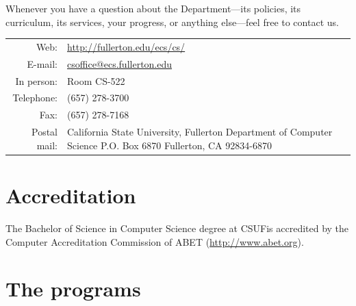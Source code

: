 \documentclass{book}
\newcommand{\campusname}{CSUF}
\begin{document}
Whenever you have a question about the Department---its policies, its curriculum, its services, your progress, or anything else---feel free to contact us.

\begin{tabular}{r p{6in}} %
  Web: & \url{http://fullerton.edu/ecs/cs/} \\ \index{website}
  E-mail: & \href{mailto:csoffice@ecs.fullerton.edu}{csoffice@ecs.fullerton.edu} \\ \index{e-mail}
  In person: & Room CS-522 \\ \index{department office}
  Telephone: & (657) 278-3700 \\ \index{phone number} \index{telephone number}
  Fax: & (657) 278-7168 \\ \index{fax number}
  Postal mail: & California State University, Fullerton \newline\index{postal address}\index{address}Department of Computer Science \newline
P.O. Box 6870 \newline
Fullerton, CA 92834-6870
\end{tabular}

\section{Accreditation} 

The Bachelor of Science in Computer Science degree at \campusname is accredited by the Computer Accreditation Commission of ABET (\url{http://www.abet.org}).

\begin{center}
\end{center}

\section{The programs}
\end{document}
